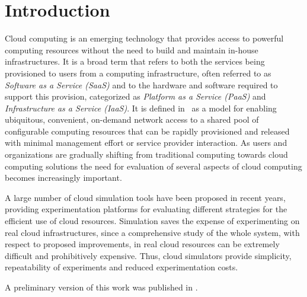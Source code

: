 \section{Introduction}


Cloud computing is an emerging technology that provides access to powerful computing resources without the need to build and maintain in-house infrastructures. It is a broad term that refers to both the services being provisioned to users from a computing infrastructure, often referred to as \textit{Software as a Service (SaaS)} and to the hardware and software required to support this provision, categorized as \textit{Platform as a Service (PaaS)} and \textit{Infrastructure as a Service (IaaS)}. It is defined in~\cite{mell2011nist} as a model for enabling ubiquitous, convenient, on-demand network access to a shared pool of configurable computing resources that can be rapidly provisioned and released with minimal management effort or service provider interaction. As users and organizations are gradually shifting from traditional computing towards cloud computing solutions the need for evaluation of several aspects of cloud computing becomes increasingly important.

A large number of cloud simulation tools have been proposed in recent years, providing experimentation platforms for evaluating different strategies for the efficient use of cloud resources. Simulation saves the expense of experimenting on real cloud infrastructures, since a comprehensive study of the whole system, with respect to proposed improvements, in real cloud resources can be extremely difficult and prohibitively expensive. Thus, cloud simulators provide simplicity, repeatability of experiments and reduced experimentation costs.


A preliminary version of this work was published in \cite{filelis2017}.